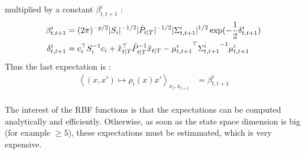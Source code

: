 multiplied by a constant $\beta^{i}_{t,t+1}$ :
\begin{align*}
  \beta^i_{t,t+1} &= (2\pi)^{-p/2} |S_i|^{-1/2} |\hat{P}_{t|T}|^{-1/2} |\Sigma^i_{t,t+1}|^{1/2} \exp(-\frac{1}{2} \delta^i_{t,t+1})\\
  \delta^i_{t,t+1} &= c_i^{\top} S_i^{-1} c_i + \hat{x}_{t \mathbin{\vert} T}^{\top} \hat{P}_{t \mathbin{\vert} T}^{-1} \hat{x}_{t \mathbin{\vert} T} - {\mu^i_{t,t+1}}^{\top} {\Sigma^i_{t,t+1}}^{-1} \mu^i_{t,t+1}\\
\end{align*}
Thus the last expectation is :
\begin{align*}
  \left< (x,x') \mapsto \rho_i(x) x' \right>_{x_{t}, x_{t+1}} &= \beta^i_{t,t+1}\\
\end{align*}

The interest of the RBF functions is that the expectations can be computed analytically and efficiently.
Otherwise, as soon as the state space dimension is big (for example $\geq 5$), these expectations must be estimmated, which is very expensive.
